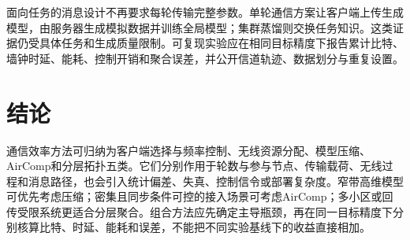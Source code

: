 面向任务的消息设计不再要求每轮传输完整参数。单轮通信方案让客户端上传生成模型，由服务器生成模拟数据并训练全局模型\cite{Zheng2023SingleRound}；集群蒸馏则交换任务知识\cite{Zhang2026FedCD}。这类证据仍受具体任务和生成质量限制。可复现实验应在相同目标精度下报告累计比特、墙钟时延、能耗、控制开销和聚合误差，并公开信道轨迹、数据划分与重复设置。

\section{结论}\label{sec:conclusion}

通信效率方法可归纳为客户端选择与频率控制、无线资源分配、模型压缩、AirComp和分层拓扑五类。它们分别作用于轮数与参与节点、传输载荷、无线过程和消息路径，也会引入统计偏差、失真、控制信令或部署复杂度。窄带高维模型可优先考虑压缩；密集且同步条件可控的接入场景可考虑AirComp；多小区或回传受限系统更适合分层聚合。组合方法应先确定主导瓶颈，再在同一目标精度下分别核算比特、时延、能耗和误差，不能把不同实验基线下的收益直接相加。
